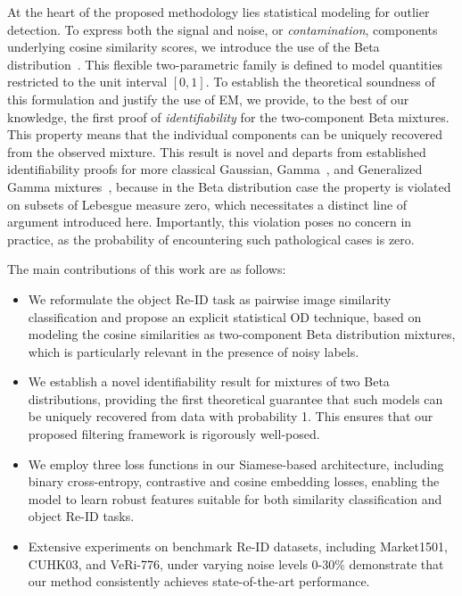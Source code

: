 \documentclass[lettersize,journal]{IEEEtran}
\begin{document}
At the heart of the proposed methodology lies statistical modeling for outlier detection. To express both the signal and noise, or {\it contamination}, components underlying cosine similarity scores, we introduce the use of the Beta distribution~\cite{gupta2004handbook}. This flexible two-parametric family is defined to model quantities restricted to the unit interval $[0,1]$. To establish the theoretical soundness of this formulation and justify the use of EM, we provide, to the best of our knowledge, the first proof of {\it identifiability} for the two-component Beta mixtures. This property means that the individual components can be uniquely recovered from the observed mixture. This result is novel and departs from established identifiability proofs for more classical Gaussian, Gamma~\cite{atienza2006new}, and Generalized Gamma mixtures~\cite{li2015unsupervised}, because in the Beta distribution case the property is violated on subsets of Lebesgue measure zero, which necessitates a distinct line of argument introduced here. Importantly, this violation poses no concern in practice, as the probability of encountering such pathological cases is zero.

The main contributions of this work are as follows:
\begin{itemize}
\item We reformulate the object Re-ID task as pairwise image similarity classification
and propose an explicit statistical OD technique, based
on modeling the cosine similarities as two-component Beta distribution mixtures, which is particularly relevant in the presence of noisy labels.

\item We establish a novel identifiability result for mixtures of two Beta distributions, providing the first theoretical guarantee that such models can be uniquely recovered from data with probability 1. This ensures that our proposed filtering framework is rigorously well-posed.

\item We employ three loss functions in our Siamese-based architecture, including binary cross-entropy, contrastive and cosine embedding losses, enabling the model to learn robust features suitable for both similarity classification and object Re-ID tasks.

\item Extensive experiments on benchmark Re-ID datasets, including Market1501, CUHK03, and VeRi-776, under varying noise levels 0-30\% demonstrate that our method consistently achieves state-of-the-art performance.

\end{itemize}
\end{document}
